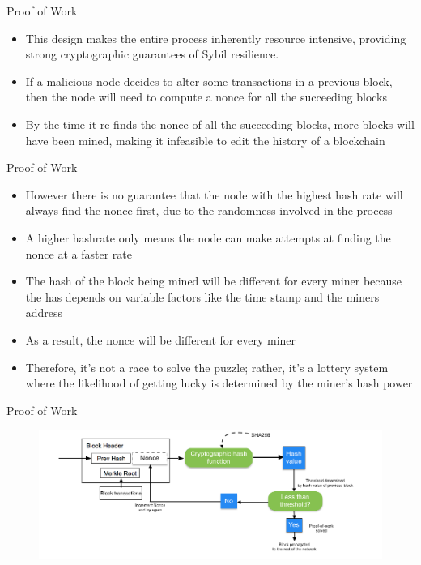 \documentclass[10pt]{beamer}
\begin{document}

\begin{frame}{Proof of Work}
	\begin{itemize}
		\item This design makes the entire process inherently resource intensive, providing strong cryptographic guarantees of Sybil resilience.
		\item If a malicious node decides to alter some transactions in a previous block, then the node will need to compute a nonce for all the succeeding blocks
		\item By the time it re-finds the nonce of all the succeeding blocks, more blocks will have been mined, making it infeasible to edit the history of a blockchain
	\end{itemize}
\end{frame}


\begin{frame}{Proof of Work}
	\begin{itemize}
		\item However there is no guarantee that the node with the highest hash rate will always find the nonce first, due to the randomness involved in the process
		\item A higher hashrate only means the node can make attempts at finding the nonce at a faster rate
		\item The hash of the block being mined will be different for every miner because the has depends on variable factors like the time stamp and the miners address
		\item As a result, the nonce will be different for every miner
		\item Therefore, it's not a race to solve the puzzle; rather, it's a lottery system where the likelihood of getting lucky is determined by the miner's hash power
	\end{itemize}
\end{frame}


\begin{frame}{Proof of Work}
	\begin{figure}[]
		\centering
		\includegraphics  [scale=0.35]{Images/pow}
	\end{figure}
\end{frame}
\end{document}
